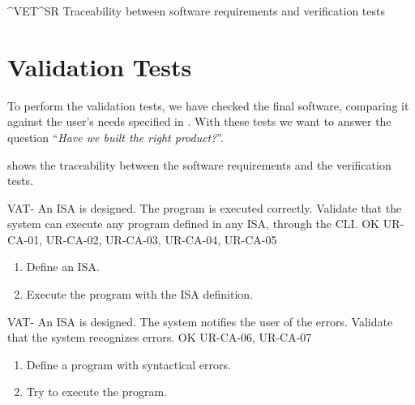 \begin{landscape}
    {^VET}{^SR}
    {Traceability between software requirements and verification tests}
\end{landscape}



\FloatBarrier


\section{Validation Tests}\label{sec:validation}
To perform the validation tests, we have checked the final software, comparing it against the user's needs specified in . With these tests we want to answer the question ``\textit{Have we built the right product?}''.

 shows the traceability between the software requirements and the verification tests.

\setcounter{i}{1}

\begin{testCase}{VAT-}
  {An \gls{ISA} is designed.}  %
  {The program is executed correctly.}  %
  {Validate that the system can execute any program defined in any \gls{ISA}, through the CLI.}  %
  {OK}  %
  {UR-CA-01, UR-CA-02, UR-CA-03, UR-CA-04, UR-CA-05}  %
  \begin{enumerate}[leftmargin=*, topsep=0pt, noitemsep]  %
    \item Define an \gls{ISA}.
    \item Execute the program with the \gls{ISA} definition.
  \end{enumerate}
\end{testCase}

\begin{testCase}{VAT-}
  {An \gls{ISA} is designed.}  %
  {The system notifies the user of the errors.}  %
  {Validate that the system recognizes errors.}  %
  {OK}  %
  {UR-CA-06, UR-CA-07}  %
  \begin{enumerate}[leftmargin=*, topsep=0pt, noitemsep]  %
    \item Define a program with syntactical errors.
    \item Try to execute the program.
  \end{enumerate}
\end{testCase}

